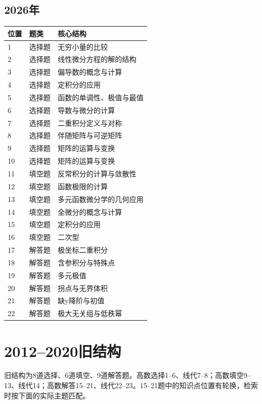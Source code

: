 \subsection*{2026年}
\begin{longtable}{p{9mm}p{25mm}p{109mm}}\toprule 位置&题类&核心结构\\\midrule\endhead
1&选择题&无穷小量的比较\\
2&选择题&线性微分方程的解的结构\\
3&选择题&偏导数的概念与计算\\
4&选择题&定积分的应用\\
5&选择题&函数的单调性、极值与最值\\
6&选择题&导数与微分的计算\\
7&选择题&二重积分定义与对称\\
8&选择题&伴随矩阵与可逆矩阵\\
9&选择题&矩阵的运算与变换\\
10&选择题&矩阵的运算与变换\\
11&填空题&反常积分的计算与敛散性\\
12&填空题&函数极限的计算\\
13&填空题&多元函数微分学的几何应用\\
14&填空题&全微分的概念与计算\\
15&填空题&定积分的应用\\
16&填空题&二次型\\
17&解答题&极坐标二重积分\\
18&解答题&含参积分与特殊点\\
19&解答题&多元极值\\
20&解答题&拐点与无界体积\\
21&解答题&缺y降阶与初值\\
22&解答题&极大无关组与低秩幂\\
\bottomrule\end{longtable}
\normalsize\section{2012--2020旧结构}
旧结构为8道选择、6道填空、9道解答题。高数选择1--6、线代7--8；高数填空9--13、线代14；高数解答15--21、线代22--23。15--21题中的知识点位置有轮换，检索时按下面的实际主题匹配。

